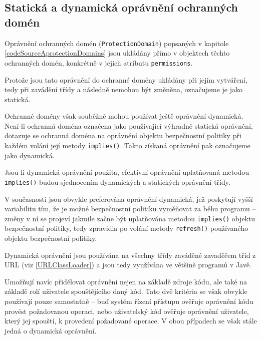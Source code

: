 \subsection{Statická a dynamická oprávnění ochranných domén} \label{staticPerm}

Oprávnění ochranných domén ({\tt ProtectionDomain}) popsaných v kapitole \ref{codeSourceAprotectionDomains} jsou ukládány přímo v objektech těchto ochranných domén,
konkrétně v jejich atributu {\tt permissions}. \cite{sourceProtectionDomain}

Protože jsou tato oprávnění do ochranné domény ukládány při jejím vytváření, tedy při zavádění třídy a následně nemohou být změněna, označujeme je jako statická.

Ochranné domény však souběžně mohou používat ještě oprávnění dynamická. Není-li ochranná doména označena jako používající výhradně statická oprávnění,
dotazuje se ochranná doména na oprávnění objektu bezpečnostní politiky při každém volání její metody {\tt implies()}.
Takto získaná oprávnění pak označujeme jako dynamická. \cite{sourceProtectionDomain}

Jsou-li dynamická oprávnění použita, efektivní oprávnění uplatňovaná metodou {\tt implies()} budou sjednocením dynamických a statických oprávnění třídy.
\cite{sourceProtectionDomain}

V současnosti jsou obvykle preferována oprávnění dynamická, jež poskytují vyšší variabilitu tím, že je možné bezpečnostní politiku vyměňovat za běhu
programu -- změny v ní se projeví jakmile začne být uplatňována metodou {\tt implies()} objektu bezpečnostní politiky, tedy zpravidla po volání metody
{\tt refresh()} používaného objektu bezpečnostní politiky.

Dynamická oprávnění jsou používána na všechny třídy zaváděné zavaděčem tříd z URL (viz \ref{URLClassLoader}) a jsou tedy využívána ve většině programů v Javě.
\cite{sourceURLClassLoader}

Umožňují navíc přidělovat oprávnění nejen na základě zdroje kódu, ale také na základě rolí uživatele spouštějícího daný kód. Tato dvě kritéria se však
obvykle používají pouze samostatně -- buď systém řízení přístupu ověřuje oprávnění kódu provést požadovanou operaci, nebo uživatelský kód ověřuje oprávnění
uživatele, který jej spouští, k provedení požadované operace. V obou případech se však stále jedná o dynamická oprávnění.

